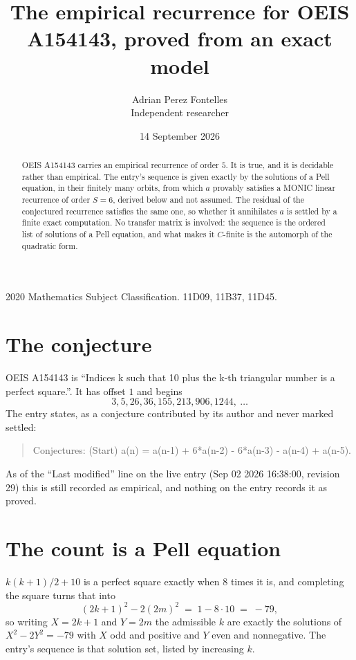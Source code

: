 \documentclass[11pt,a4paper]{article}
\title{The empirical recurrence for OEIS A154143, proved from an exact model}
\author{Adrian Perez Fontelles\\ \small Independent researcher}
\date{14 September 2026}
\theoremstyle{plain}
\theoremstyle{definition}
\begin{document}
\maketitle

\begin{abstract}
OEIS A154143 carries an empirical recurrence of order $5$. It is true, and it is
decidable rather than empirical. The entry's sequence is given exactly by the solutions of a Pell equation, in their finitely many orbits, from
which $a$ provably satisfies a MONIC linear recurrence of order $S=6$, derived below and not
assumed. The residual of the conjectured recurrence satisfies the same one, so whether it
annihilates $a$ is settled by a finite exact computation. No transfer matrix is involved: the sequence is the ordered list of solutions of a Pell equation, and what makes it $C$-finite is the automorph of the quadratic form.
\end{abstract}

\noindent\small 2020 Mathematics Subject Classification. 11D09, 11B37, 11D45.\normalsize

\section{The conjecture}

OEIS A154143 is ``Indices k such that 10 plus the k-th triangular number is a perfect square.''. It has offset $1$ and begins
\[
3, 5, 26, 36, 155, 213, 906, 1244,\ \dots
\]
The entry states, as a conjecture contributed by its author and never marked settled:
\begin{quote}
Conjectures: (Start) a(n) = a(n-1) + 6*a(n-2) - 6*a(n-3) - a(n-4) + a(n-5).
\end{quote}
As of the ``Last modified'' line on the live entry (Sep 02 2026 16:38:00, revision 29)
this is still recorded as empirical, and nothing on the entry records it as proved.

\section{The count is a Pell equation}

$k(k+1)/2 + 10$ is a perfect square exactly when $8$ times it is, and completing the square
turns that into
\[
(2k+1)^2-2(2m)^2\;=\;1-8\cdot10\;=\;-79,
\]
so writing $X=2k+1$ and $Y=2m$ the admissible $k$ are exactly the solutions of $X^2-2Y^2=-79$
with $X$ odd and positive and $Y$ even and nonnegative. The entry's sequence is that solution
set, listed by increasing $k$.
\end{document}
